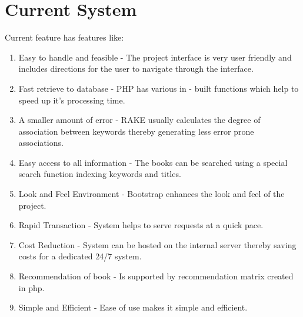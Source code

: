 \documentclass[a4paper,12pt]{report}
\begin{document}
  \section{Current System}
  Current feature has features like:
  \begin{enumerate}
    \item Easy to handle and feasible - The project interface is very user friendly and includes directions for the user to navigate through the interface.
    \item Fast retrieve to database - PHP has various in - built functions which help to speed up it's processing time.
    \item A smaller amount of error - RAKE usually calculates the degree of association between keywords thereby generating less error prone associations.
    \item Easy access to all information - The books can be searched using a special search function indexing keywords and titles.
    \item Look and Feel Environment - Bootstrap enhances the look and feel of the project.
    \item Rapid Transaction - System helps to serve requests at a quick pace.
    \item Cost Reduction - System can be hosted on the internal server thereby saving costs for a dedicated 24/7 system.
    \item Recommendation of book - Is supported by recommendation matrix created in php.
    \item Simple and Efficient - Ease of use makes it simple and efficient.
  \end{enumerate}

  \pagebreak
\end{document}
